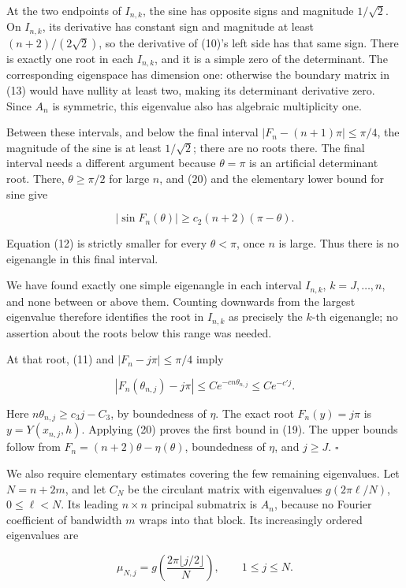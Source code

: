 \documentclass[10pt,a4paper]{article}
\begin{document}
At the two endpoints of \(I_{n,k}\), the sine has opposite signs and magnitude \(1/\sqrt2\). On \(I_{n,k}\), its derivative has constant sign and magnitude at least \((n+2)/(2\sqrt2)\), so the derivative of (10)'s left side has that same sign. There is exactly one root in each \(I_{n,k}\), and it is a simple zero of the determinant. The corresponding eigenspace has dimension one: otherwise the boundary matrix in (13) would have nullity at least two, making its determinant derivative zero. Since \(A_n\) is symmetric, this eigenvalue also has algebraic multiplicity one.

Between these intervals, and below the final interval \(|F_n-(n+1)\pi|\le\pi/4\), the magnitude of the sine is at least \(1/\sqrt2\); there are no roots there. The final interval needs a different argument because \(\theta=\pi\) is an artificial determinant root. There, \(\theta\ge\pi/2\) for large \(n\), and (20) and the elementary lower bound for sine give

\nopagebreak[3]
\[
|\sin F_n(\theta)|\ge c_2(n+2)(\pi-\theta).
\]

Equation (12) is strictly smaller for every \(\theta<\pi\), once \(n\) is large. Thus there is no eigenangle in this final interval.

We have found exactly one simple eigenangle in each interval \(I_{n,k}\), \(k=J,\ldots,n\), and none between or above them. Counting downwards from the largest eigenvalue therefore identifies the root in \(I_{n,k}\) as precisely the \(k\)-th eigenangle; no assertion about the roots below this range was needed.

At that root, (11) and \(|F_n-j\pi|\le\pi/4\) imply

\nopagebreak[3]
\[
|F_n(\theta_{n,j})-j\pi|\le C e^{-cn\theta_{n,j}}\le C e^{-c'j}.
\]

Here \(n\theta_{n,j}\ge c_3j-C_3\), by boundedness of \(\eta\). The exact root \(F_n(y)=j\pi\) is \(y=Y(x_{n,j},h)\). Applying (20) proves the first bound in (19). The upper bounds follow from \(F_n=(n+2)\theta-\eta(\theta)\), boundedness of \(\eta\), and \(j\ge J\). \(\square\)

We also require elementary estimates covering the few remaining eigenvalues. Let \(N=n+2m\), and let \(C_N\) be the circulant matrix with eigenvalues \(g(2\pi\ell/N)\), \(0\le\ell<N\). Its leading \(n\times n\) principal submatrix is \(A_n\), because no Fourier coefficient of bandwidth \(m\) wraps into that block. Its increasingly ordered eigenvalues are

\nopagebreak[3]
\[
\mu_{N,j}=g\left(\frac{2\pi\lfloor j/2\rfloor}{N}\right),\qquad 1\le j\le N.
\]
\end{document}
